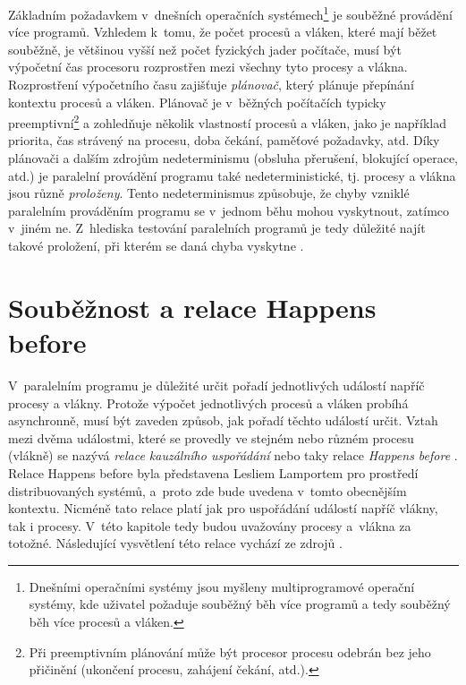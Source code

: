 Základním požadavkem v~dnešních operačních systémech\footnote{Dnešními operačními systémy jsou myšleny multiprogramové operační systémy, kde uživatel požaduje souběžný běh více programů a tedy souběžný běh více procesů a vláken.} je souběžné provádění více programů. Vzhledem k~tomu, že počet procesů a vláken, které mají běžet souběžně, je většinou vyšší než počet fyzických jader počítače, musí být výpočetní čas procesoru rozprostřen mezi všechny tyto procesy a vlákna. Rozprostření výpočetního času zajišťuje \textit{plánovač}, který plánuje přepínání kontextu procesů a vláken. Plánovač je v~běžných počítačích typicky preemptivní\footnote{Při preemptivním plánování může být procesor procesu odebrán bez jeho přičinění (ukončení procesu, zahájení čekání, atd.).} a zohledňuje několik vlastností procesů a vláken, jako je například priorita, čas strávený na procesu, doba čekání, paměťové požadavky, atd. Díky plánovači a dalším zdrojům nedeterminismu (obsluha přerušení, blokující operace, atd.) je paralelní provádění programu také nedeterministické, tj. procesy a vlákna jsou různě \textit{proloženy}. Tento nedeterminismus způsobuje, že chyby vzniklé paralelním prováděním programu se v~jednom běhu mohou vyskytnout, zatímco v~jiném ne. Z~hlediska testování paralelních programů je tedy důležité najít takové proložení, při kterém se daná chyba vyskytne \cite{cite:OS1}. 


\section{Souběžnost a relace Happens before}\label{happens-before}

V~paralelním programu je důležité určit pořadí jednotlivých událostí napříč procesy a vlákny. Protože výpočet jednotlivých procesů a vláken probíhá asynchronně, musí být zaveden způsob, jak pořadí těchto událostí určit. Vztah mezi dvěma událostmi, které se provedly ve stejném nebo různém procesu (vlákně) se nazývá \textit{relace kauzálního uspořádání} nebo taky relace \textit{Happens before} \cite{cite:HB}. Relace Happens before byla představena Lesliem Lamportem pro prostředí distribuovaných systémů, a~proto zde bude uvedena v~tomto obecnějším kontextu. Nicméně tato relace platí jak pro uspořádání událostí napříč vlákny, tak i procesy. V~této kapitole tedy budou uvažovány procesy a~vlákna za totožné. Následující vysvětlení této relace vychází ze zdrojů \cite{cite:HB,cite:PDI}.

